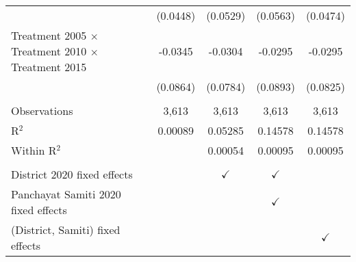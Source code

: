 \begin{tabular}{lcccc}
                                                                         & (0.0448)       & (0.0529)      & (0.0563)      & (0.0474)\\   
   Treatment 2005 $ \times $ Treatment  2010 $ \times $ Treatment 2015   & -0.0345        & -0.0304       & -0.0295       & -0.0295\\   
                                                                         & (0.0864)       & (0.0784)      & (0.0893)      & (0.0825)\\   
    \\
   Observations                                                          & 3,613          & 3,613         & 3,613         & 3,613\\  
   R$^2$                                                                 & 0.00089        & 0.05285       & 0.14578       & 0.14578\\  
   Within R$^2$                                                          &                & 0.00054       & 0.00095       & 0.00095\\  
    \\
   District 2020 fixed effects                                           &                & $\checkmark$  & $\checkmark$  & \\  
   Panchayat Samiti 2020 fixed effects                                   &                &               & $\checkmark$  & \\  
   (District, Samiti) fixed effects                                      &                &               &               & $\checkmark$\\   
   \bottomrule
\end{tabular}
\par\endgroup



